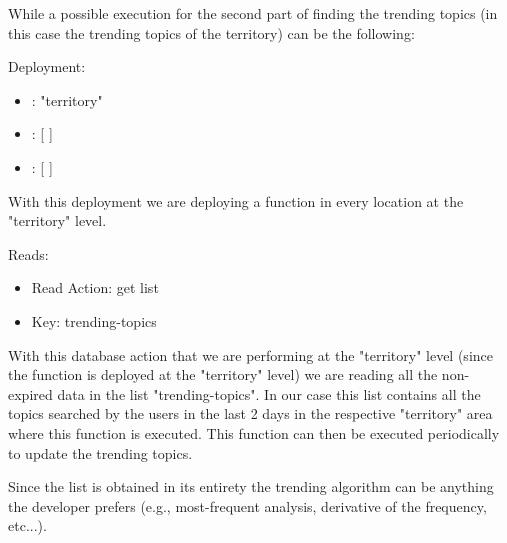 While a possible execution for the second part of finding the trending topics (in this case the trending topics of the territory) can be the following:
\begin{example}
Deployment:
\begin{itemize}
    \item {}: "territory"
    \item {}: [ ]
    \item {}: [ ]
\end{itemize}
With this deployment we are deploying a function in every location at the "territory" level.

Reads:
\begin{itemize}
    \item Read Action: get list
    \item Key: trending-topics
\end{itemize}
With this database action that we are performing at the "territory" level (since the function is deployed at the "territory" level) we are reading all the non-expired data in the list "trending-topics". In our case this list contains all the topics searched by the users in the last 2 days in the respective "territory" area where this function is executed. This function can then be executed periodically to update the trending topics.

Since the list is obtained in its entirety the trending algorithm can be anything the developer prefers (e.g., most-frequent analysis, derivative of the frequency, etc...).
\end{example}
